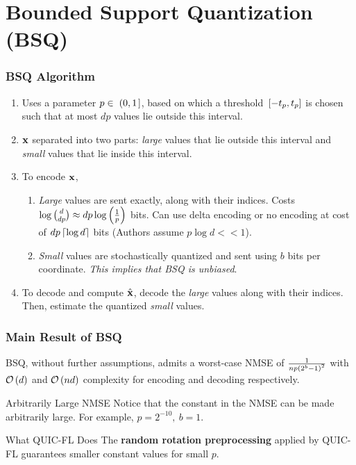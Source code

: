 \documentclass{beamer}
\begin{document}
    \section{Bounded Support Quantization (BSQ)}
    \begin{frame}
        \frametitle{BSQ Algorithm}
        \begin{enumerate}
            \item Uses a parameter \(p\in{}\left.\left(0,1\right.\right]\), based on which 
            a threshold  \({}\left[-t_p,t_p\right]\) is chosen such that at most \(dp\)
            values lie outside this interval.
            \item \(\boldsymbol{\mathbf{x}}\) separated into two parts: \emph{large}
            values that lie outside this interval and \emph{small} values
            that lie inside this interval.
            \item To encode \(\boldsymbol{\mathbf{x}}\),
            \begin{enumerate}
                \item \emph{Large} values are sent exactly, along with their
                indices. Costs \(\log\binom{d}{dp} \approx 
                dp\log\left(\frac{1}{p}\right)\) bits. Can use delta encoding or
                no encoding at cost of \(dp\left\lceil\log d\right\rceil\) bits (Authors assume
                \(p\log d << 1\)).
                \item \emph{Small} values are stochastically quantized and sent
                using \(b\) bits per coordinate. \emph{This implies that BSQ is
                unbiased}.
            \end{enumerate}
            \item To decode and compute \(\hat{\boldsymbol{\mathbf{x}}}\), decode the
            \emph{large} values along with their indices. Then, estimate the
            quantized \emph{small} values.
        \end{enumerate}
    \end{frame}

    \begin{frame}
        \frametitle{Main Result of BSQ}
        \begin{lemma}
            BSQ, without further assumptions, admits a worst-case NMSE of
            \(\frac{1}{np\left(2^b-1\right)^2}\) with \(\mathcal O\left(d\right)\) and
            \(\mathcal O\left(nd\right)\) complexity for encoding and decoding respectively.
        \end{lemma}
        \begin{exampleblock}{Arbitrarily Large NMSE}
            Notice that the constant in the NMSE can be made arbitrarily large.
            For example, \(p = 2^{-10},\ b = 1\).
        \end{exampleblock}
        \begin{alertblock}{What QUIC-FL Does}
            The \textbf{random rotation preprocessing} applied by QUIC-FL
            guarantees smaller constant values for small \(p\).
        \end{alertblock}
    \end{frame}
    
\end{document}
